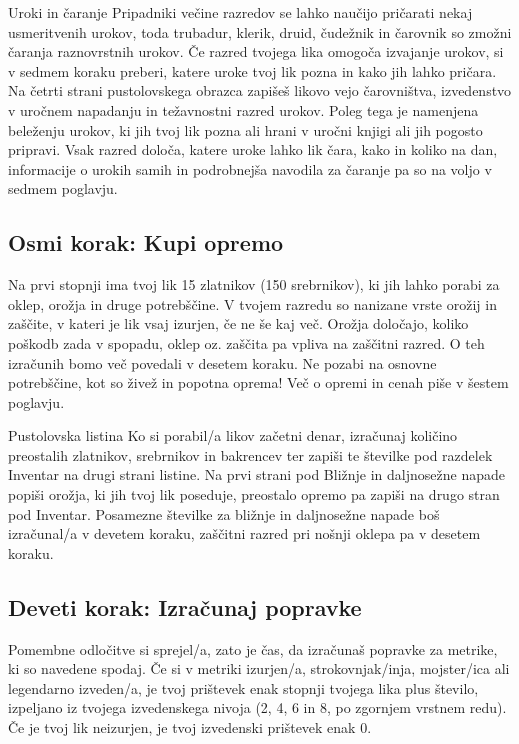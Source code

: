 \begin{rpg-titlebox}{Uroki in čaranje}
    Pripadniki večine razredov se lahko naučijo pričarati nekaj usmeritvenih urokov, toda trubadur, klerik, druid, čudežnik in čarovnik so zmožni čaranja raznovrstnih urokov. Če razred tvojega lika omogoča izvajanje urokov, si v sedmem koraku preberi, katere uroke tvoj lik pozna in kako jih lahko pričara. Na četrti strani pustolovskega obrazca zapišeš likovo vejo čarovništva, izvedenstvo v uročnem napadanju in težavnostni razred urokov. Poleg tega je namenjena beleženju urokov, ki jih tvoj lik pozna ali hrani v uročni knjigi ali jih pogosto pripravi. Vsak razred določa, katere uroke lahko lik čara, kako in koliko na dan, informacije o urokih samih in podrobnejša navodila za čaranje pa so na voljo v sedmem poglavju.
\end{rpg-titlebox}

\subsection{Osmi korak: Kupi opremo}
Na prvi stopnji ima tvoj lik 15 zlatnikov (150 srebrnikov), ki jih lahko porabi za oklep, orožja in druge potrebščine. V tvojem razredu so nanizane vrste orožij in zaščite, v kateri je lik vsaj izurjen, če ne še kaj več. Orožja določajo, koliko poškodb zada v spopadu, oklep oz. zaščita pa vpliva na zaščitni razred. O teh izračunih bomo več povedali v desetem koraku. Ne pozabi na osnovne potrebščine, kot so živež in popotna oprema! Več o opremi in cenah piše v šestem poglavju.

\begin{rpg-titlebox}{Pustolovska listina}
    Ko si porabil/a likov začetni denar, izračunaj količino preostalih zlatnikov, srebrnikov in bakrencev ter zapiši te številke pod razdelek Inventar na drugi strani listine. Na prvi strani pod Bližnje in daljnosežne napade popiši orožja, ki jih tvoj lik poseduje, preostalo opremo pa zapiši na drugo stran pod Inventar. Posamezne številke za bližnje in daljnosežne napade boš izračunal/a v devetem koraku, zaščitni razred pri nošnji oklepa pa v desetem koraku.
\end{rpg-titlebox}

\subsection{Deveti korak: Izračunaj popravke}
Pomembne odločitve si sprejel/a, zato je čas, da izračunaš popravke za metrike, ki so navedene spodaj. Če si v metriki izurjen/a, strokovnjak/inja, mojster/ica ali legendarno izveden/a, je tvoj prištevek enak stopnji tvojega lika plus število, izpeljano iz tvojega izvedenskega nivoja (2, 4, 6 in 8, po zgornjem vrstnem redu). Če je tvoj lik neizurjen, je tvoj izvedenski prištevek enak 0.

